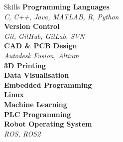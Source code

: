 \documentclass{custom-resume}
\begin{document}
{\begin{minipage}[t][23cm]{\leftouterwidth}
\begin{minipage}[t][23cm]{\leftinnerwidth}

    \begin{section*}{Skills}
      \textbf{Programming Languages} \\[2pt]
      \textit{C, C++, Java, MATLAB, R, Python} \\[8pt]

      \textbf{Version Control} \\[2pt]
      \textit{Git, GitHub, GitLab, SVN} \\[8pt]

      \textbf{CAD \& PCB Design} \\[2pt]
      \textit{Autodesk Fusion, Altium} \\[8pt]

      \textbf{3D Printing} \\[8pt]

      \textbf{Data Visualisation} \\[8pt]

      \textbf{Embedded Programming} \\[8pt]

      \textbf{Linux} \\[8pt]

      \textbf{Machine Learning} \\[8pt]

      \textbf{PLC Programming} \\[8pt]

      \textbf{Robot Operating System} \\[2pt]
      \textit{ROS, ROS2}
    \end{section*}

  \end{minipage}
\end{minipage}}%
\hspace{\innerspacing}%
\end{document}
